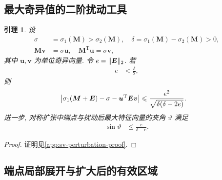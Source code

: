\documentclass{ctexart}
\newcommand{\q}{\quad}
\newcommand{\T}{\mathrm{T}}
\newcommand{\dt}{\delta}
\renewcommand{\le}{\leqslant}
\DeclarePairedDelimiter\norm{\lVert}{\rVert}
\DeclarePairedDelimiter\abs{\lvert}{\rvert}
\newtheorem{lemma}[theorem]{引理}
\begin{document}
\subsection{最大奇异值的二阶扰动工具}
\label{subsec:singular-value-perturbation}

\begin{lemma}
\label{lem:singular-value-perturbation}
设
\begin{align}
    \sigma&=\sigma_1(\bm M)>\sigma_2(\bm M),\q
    \dt=\sigma_1(\bm M)-\sigma_2(\bm M)>0,
    \label{eq:sv-gap}\\
    \bm M\bm v&=\sigma\bm u,\q \bm M^\T\bm u=\sigma\bm v,
    \label{eq:sv-singular-vectors}
\end{align}
其中 $\bm u,\bm v$ 为单位奇异向量. 令 $e=\norm{\bm E}_2$. 若
\begin{align}
    e&<\frac{\dt}{2},
    \label{eq:sv-perturbation-domain}
\end{align}
则
\begin{align}
    \abs*{\sigma_1(\bm M+\bm E)-\sigma-\bm u^\T\bm E\bm v}
    &\le
    \frac{e^2}{\sqrt{\dt(\dt-2e)}}.
    \label{eq:sv-second-order-bound}
\end{align}
进一步, 对称扩张中端点与扰动后最大特征向量的夹角 $\vartheta$ 满足
\begin{align}
    \sin\vartheta&\le\frac{e}{\dt-e}.
    \label{eq:sv-eigenvector-angle-bound}
\end{align}
\end{lemma}

\begin{proof}
证明见\cref{app:sv-perturbation-proof}.
\end{proof}

\subsection{端点局部展开与扩大后的有效区域}
\label{subsec:endpoint-local-expansion}
\end{document}
